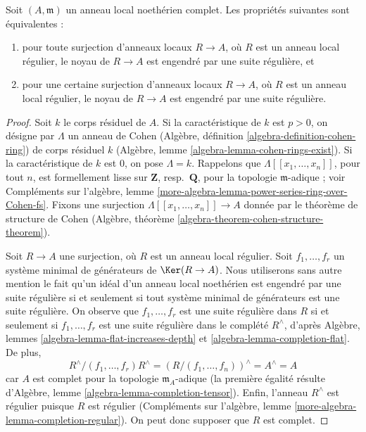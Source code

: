 \begin{lemma}
\label{lemma-ci-well-defined}
Soit $(A, \mathfrak m)$ un anneau local noethérien complet. Les
propriétés suivantes sont équivalentes :
\begin{enumerate}
\item pour toute surjection d'anneaux locaux $R \to A$, où $R$
est un anneau local régulier, le noyau de $R \to A$ est engendré
par une suite régulière, et
\item pour une certaine surjection d'anneaux locaux $R \to A$, où $R$
est un anneau local régulier, le noyau de $R \to A$ est engendré
par une suite régulière.
\end{enumerate}
\end{lemma}

\begin{proof}
Soit $k$ le corps résiduel de $A$. Si la caractéristique de
$k$ est $p > 0$, on désigne par $\Lambda$ un anneau de
Cohen (Algèbre, définition \ref{algebra-definition-cohen-ring})
de corps résiduel $k$ (Algèbre, lemme \ref{algebra-lemma-cohen-rings-exist}).
Si la caractéristique de $k$ est $0$, on pose $\Lambda = k$.
Rappelons que $\Lambda[[x_1, \ldots, x_n]]$, pour tout $n$,
est formellement lisse sur $\mathbf{Z}$, resp.\ $\mathbf{Q}$,
pour la topologie $\mathfrak m$-adique ; voir
Compléments sur l'algèbre, lemme
\ref{more-algebra-lemma-power-series-ring-over-Cohen-fs}.
Fixons une surjection $\Lambda[[x_1, \ldots, x_n]] \to A$ donnée
par le théorème de structure de
Cohen (Algèbre, théorème \ref{algebra-theorem-cohen-structure-theorem}).

\medskip\noindent
Soit $R \to A$ une surjection, où $R$ est un
anneau local régulier. Soit $f_1, \ldots, f_r$ un système minimal de générateurs
de $\Ker(R \to A)$. Nous utiliserons sans autre mention le
fait qu'un idéal d'un anneau local noethérien est engendré par une suite
régulière si et seulement si tout système minimal de générateurs est
une suite régulière. On observe que $f_1, \ldots, f_r$
est une suite régulière dans $R$ si et seulement si $f_1, \ldots, f_r$
est une suite régulière dans le complété $R^\wedge$,
d'après Algèbre, lemmes \ref{algebra-lemma-flat-increases-depth} et
\ref{algebra-lemma-completion-flat}.
De plus,
$$
R^\wedge/(f_1, \ldots, f_r)R^\wedge =
(R/(f_1, \ldots, f_n))^\wedge = A^\wedge = A
$$
car $A$ est complet pour la topologie $\mathfrak m_A$-adique (la première égalité résulte
d'Algèbre, lemme \ref{algebra-lemma-completion-tensor}). Enfin,
l'anneau $R^\wedge$ est régulier puisque $R$ est régulier
(Compléments sur l'algèbre, lemme \ref{more-algebra-lemma-completion-regular}). On
peut donc supposer que $R$ est complet.


\end{proof}
